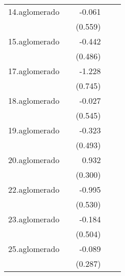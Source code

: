 {\begin{longtable}{l*{4}{D{.}{.}{-1}}}
\addlinespace
14.aglomerado&                     &      -0.061         &                     &                     \\
            &                     &     (0.559)         &                     &                     \\
\addlinespace
15.aglomerado&                     &      -0.442         &                     &                     \\
            &                     &     (0.486)         &                     &                     \\
\addlinespace
17.aglomerado&                     &      -1.228         &                     &                     \\
            &                     &     (0.745)         &                     &                     \\
\addlinespace
18.aglomerado&                     &      -0.027         &                     &                     \\
            &                     &     (0.545)         &                     &                     \\
\addlinespace
19.aglomerado&                     &      -0.323         &                     &                     \\
            &                     &     (0.493)         &                     &                     \\
\addlinespace
20.aglomerado&                     &       0.932\sym{**} &                     &                     \\
            &                     &     (0.300)         &                     &                     \\
\addlinespace
22.aglomerado&                     &      -0.995         &                     &                     \\
            &                     &     (0.530)         &                     &                     \\
\addlinespace
23.aglomerado&                     &      -0.184         &                     &                     \\
            &                     &     (0.504)         &                     &                     \\
\addlinespace
25.aglomerado&                     &      -0.089         &                     &                     \\
            &                     &     (0.287)         &                     &                     \\

\end{longtable}}
